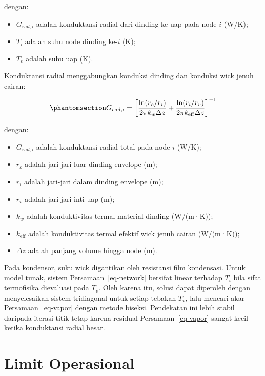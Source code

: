 \documentclass[
  indonesian,
  12pt,
  a4paper,
]{report}
\providecommand{\tightlist}{%
  \setlength{\itemsep}{0pt}\setlength{\parskip}{0pt}}
\begin{document}
dengan:

\begin{itemize}
\tightlist
\item
  \(G_{rad,i}\) adalah konduktansi radial dari dinding ke uap pada node
  \(i\) (W/K);
\item
  \(T_i\) adalah suhu node dinding ke-\(i\) (K);
\item
  \(T_v\) adalah suhu uap (K).
\end{itemize}

Konduktansi radial menggabungkan konduksi dinding dan konduksi wick
jenuh cairan:

\begin{equation}\protect\phantomsection\label{eq-grad}{ G_{rad,i} = \left[
   \frac{\ln(r_o/r_i)}{2\pi k_w \Delta z}
   + \frac{\ln(r_i/r_v)}{2\pi k_{\mathrm{eff}} \Delta z}
   \right]^{-1} }\end{equation}

dengan:

\begin{itemize}
\tightlist
\item
  \(G_{rad,i}\) adalah konduktansi radial total pada node \(i\) (W/K);
\item
  \(r_o\) adalah jari-jari luar dinding envelope (m);
\item
  \(r_i\) adalah jari-jari dalam dinding envelope (m);
\item
  \(r_v\) adalah jari-jari inti uap (m);
\item
  \(k_w\) adalah konduktivitas termal material dinding (W/(m·K));
\item
  \(k_{\mathrm{eff}}\) adalah konduktivitas termal efektif wick jenuh
  cairan (W/(m·K));
\item
  \(\Delta z\) adalah panjang volume hingga node (m).
\end{itemize}

Pada kondensor, suku wick digantikan oleh resistansi film kondensasi.
Untuk model tunak, sistem Persamaan~\ref{eq-network} bersifat linear
terhadap \(T_i\) bila sifat termofisika dievaluasi pada \(T_v\). Oleh
karena itu, solusi dapat diperoleh dengan menyelesaikan sistem
tridiagonal untuk setiap tebakan \(T_v\), lalu mencari akar
Persamaan~\ref{eq-vapor} dengan metode biseksi. Pendekatan ini lebih
stabil daripada iterasi titik tetap karena residual
Persamaan~\ref{eq-vapor} sangat kecil ketika konduktansi radial besar.

\section{Limit Operasional}\label{limit-operasional}
\end{document}
